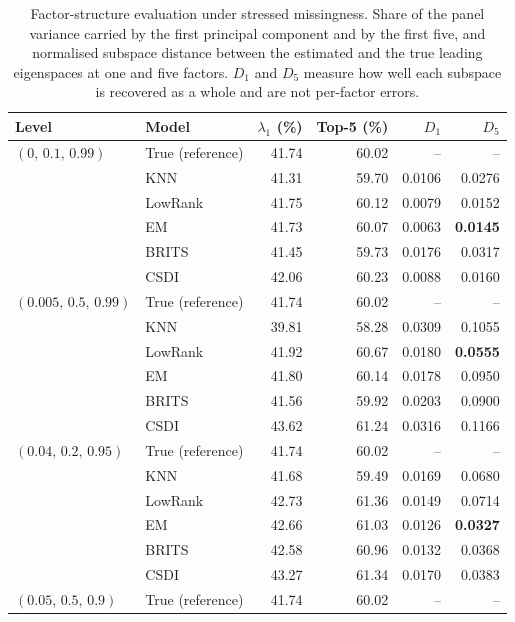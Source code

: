 \begin{table}[htbp]
  \centering
  \footnotesize
  \caption[Factor-structure evaluation under stressed missingness]{Factor-structure evaluation under stressed missingness. Share of the panel variance carried by the first principal component and by the first five, and normalised subspace distance between the estimated and the true leading eigenspaces at one and five factors. $D_1$ and $D_5$ measure how well each subspace is recovered as a whole and are not per-factor errors.}
  \label{tab:factors_stressed}
  \begin{tabular}{llrrrr}
    \toprule
    Level & Model & $\lambda_1$ (\%) & Top-5 (\%) & $D_1$ & $D_5$ \\
    \midrule
    $(0,\, 0.1,\, 0.99)$ & True (reference) & 41.74 & 60.02 & -- & -- \\
     & KNN & 41.31 & 59.70 & 0.0106 & 0.0276 \\
     & LowRank & 41.75 & 60.12 & 0.0079 & 0.0152 \\
     & EM & 41.73 & 60.07 & 0.0063 & \textbf{0.0145} \\
     & BRITS & 41.45 & 59.73 & 0.0176 & 0.0317 \\
     & CSDI & 42.06 & 60.23 & 0.0088 & 0.0160 \\
    \midrule
    $(0.005,\, 0.5,\, 0.99)$ & True (reference) & 41.74 & 60.02 & -- & -- \\
     & KNN & 39.81 & 58.28 & 0.0309 & 0.1055 \\
     & LowRank & 41.92 & 60.67 & 0.0180 & \textbf{0.0555} \\
     & EM & 41.80 & 60.14 & 0.0178 & 0.0950 \\
     & BRITS & 41.56 & 59.92 & 0.0203 & 0.0900 \\
     & CSDI & 43.62 & 61.24 & 0.0316 & 0.1166 \\
    \midrule
    $(0.04,\, 0.2,\, 0.95)$ & True (reference) & 41.74 & 60.02 & -- & -- \\
     & KNN & 41.68 & 59.49 & 0.0169 & 0.0680 \\
     & LowRank & 42.73 & 61.36 & 0.0149 & 0.0714 \\
     & EM & 42.66 & 61.03 & 0.0126 & \textbf{0.0327} \\
     & BRITS & 42.58 & 60.96 & 0.0132 & 0.0368 \\
     & CSDI & 43.27 & 61.34 & 0.0170 & 0.0383 \\
    \midrule
    $(0.05,\, 0.5,\, 0.9)$ & True (reference) & 41.74 & 60.02 & -- & -- \\

\end{tabular}
\end{table}
